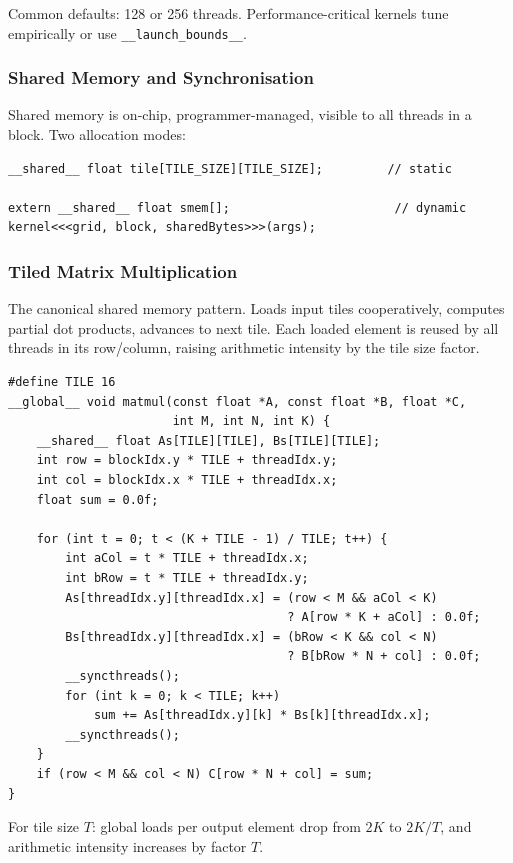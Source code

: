 \documentclass{article}
\begin{document}
Common defaults: 128 or 256 threads. Performance-critical kernels tune empirically or use \lstinline[language=CUDA]{__launch_bounds__}.

\subsubsection{Shared Memory and Synchronisation}
Shared memory is on-chip, programmer-managed, visible to all threads in a block. Two allocation modes:

\begin{lstlisting}[language=CUDA,caption={Static vs dynamic shared memory}]
__shared__ float tile[TILE_SIZE][TILE_SIZE];         // static

extern __shared__ float smem[];                       // dynamic
kernel<<<grid, block, sharedBytes>>>(args);
\end{lstlisting}

\subsubsection{Tiled Matrix Multiplication}
The canonical shared memory pattern. Loads input tiles cooperatively, computes partial dot products, advances to next tile. Each loaded element is reused by all threads in its row/column, raising arithmetic intensity by the tile size factor.

\begin{lstlisting}[language=CUDA,caption={Tiled matrix multiplication}]
#define TILE 16
__global__ void matmul(const float *A, const float *B, float *C,
                       int M, int N, int K) {
    __shared__ float As[TILE][TILE], Bs[TILE][TILE];
    int row = blockIdx.y * TILE + threadIdx.y;
    int col = blockIdx.x * TILE + threadIdx.x;
    float sum = 0.0f;

    for (int t = 0; t < (K + TILE - 1) / TILE; t++) {
        int aCol = t * TILE + threadIdx.x;
        int bRow = t * TILE + threadIdx.y;
        As[threadIdx.y][threadIdx.x] = (row < M && aCol < K)
                                       ? A[row * K + aCol] : 0.0f;
        Bs[threadIdx.y][threadIdx.x] = (bRow < K && col < N)
                                       ? B[bRow * N + col] : 0.0f;
        __syncthreads();
        for (int k = 0; k < TILE; k++)
            sum += As[threadIdx.y][k] * Bs[k][threadIdx.x];
        __syncthreads();
    }
    if (row < M && col < N) C[row * N + col] = sum;
}
\end{lstlisting}

For tile size $T$: global loads per output element drop from $2K$ to $2K/T$, and arithmetic intensity increases by factor $T$.
\end{document}
